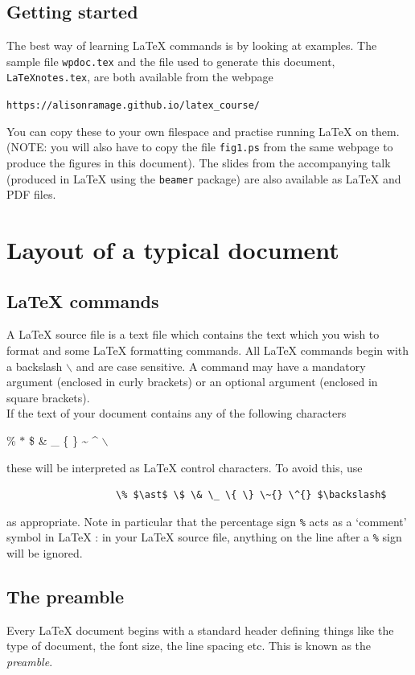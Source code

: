 \documentclass[11pt]{article}
\newcommand{\bc}{\begin{center}}
\newcommand{\ec}{\end{center}}
\newcommand{\lx}{{\LaTeX} }
\begin{document}
\subsection{Getting started}
\label{starting}
The best way of learning \lx commands is by looking at examples.
The sample file \texttt{wpdoc.tex} and the file used to generate
this document, \texttt{LaTeXnotes.tex}, are both available from the webpage 
\bc
\texttt{https://alisonramage.github.io/latex\_course/}
\ec
You can copy these to your own filespace and
practise running \lx on them. (NOTE: you will also have to copy
the file \texttt{fig1.ps} from the same webpage to produce the figures in
this document). The slides from the accompanying talk (produced in
\lx using the \texttt{beamer} package) are also available as \lx and PDF
files.


\section{Layout of a typical document}

\subsection{ \lx commands}

A \lx source file is a text file which contains the text which you
wish to format and some \lx formatting commands. All \lx commands
begin with a backslash $\backslash$ and are case sensitive. A
command may have a mandatory argument (enclosed in curly brackets)
or an optional argument (enclosed in square brackets).\\

If the text of your document contains any of the following
characters
\bc
\% $\ast$ \$ \& \_ \{ \} \~{} \^{} $\backslash$
\ec
these will be interpreted as \lx control characters. To avoid
this, use

\begin{verbatim}
                   \% $\ast$ \$ \& \_ \{ \} \~{} \^{} $\backslash$
\end{verbatim}
as appropriate.
Note in particular that the percentage sign \verb+%+ acts as a
`comment' symbol in \lx: in your \lx source file, anything on the line 
after a \verb+%+ sign will be ignored.

\subsection{The preamble}

Every \lx document begins with a standard header defining things
like the type of document, the font size, the line spacing etc.
This is known as the \textit{preamble}.\\
\end{document}
